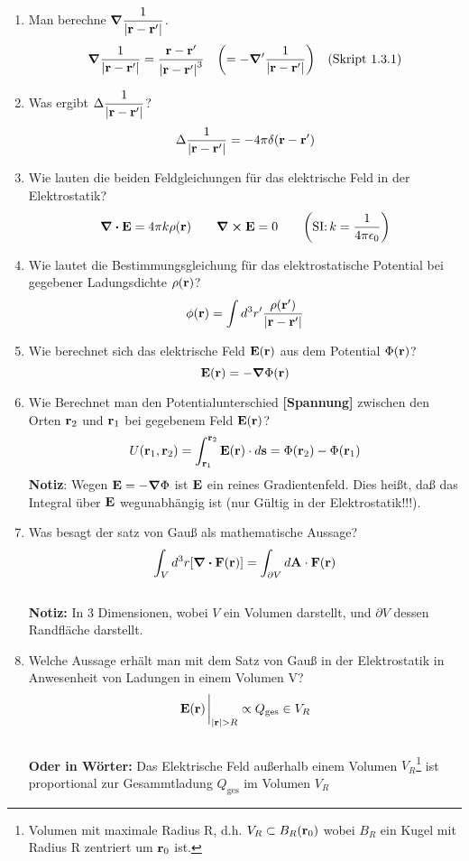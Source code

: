 \documentclass{scrartcl}
\newcommand{\rr}[1]{\frac{#1}{\abs{\vb{r}-\vb{r}'}}}
\newcommand{\ds}{\displaystyle}
\begin{document}
  \begin{enumerate}
    \item Man berechne $\ds \grad\rr{1}$.
          $$\ds \grad\rr{1}=
           \frac{\vb r -\vb r'}{\abs{\vb r - \vb r'}^3}\quad
           \qty(=-\grad'\rr{1})\quad\text{(Skript 1.3.1)}$$ 

    \item Was ergibt $\ds \Delta\rr{1}$?
          $$\ds \Delta \rr{1} = -4\pi \delta(\vb r-\vb r')$$
      
    \item Wie lauten die beiden Feldgleichungen für das 
          elektrische Feld in der Elektrostatik?
          $$\ds \div \vb E=4\pi k\rho(\vb r)\qquad\curl\vb E=0
           \qquad\qty(\text{SI:}\,k=\frac{1}{4\pi\epsilon_0})$$
    
    \item Wie lautet die Bestimmungsgleichung für das elektrostatische 
          Potential bei gegebener Ladungsdichte $\rho(\vb r)$?
          $$\ds \phi(\vb r)=\int d^3r'\rr{\rho(\vb r')}$$

    \item Wie berechnet sich das elektrische Feld $\vb E (\vb r)$ aus dem
          Potential $\Phi(\vb r)$?
          $$\ds \vb E(\vb r) = - \grad \Phi (\vb r)$$

    \item Wie Berechnet man den Potentialunterschied \textbf{[Spannung]}
          zwischen den Orten 
          $\vb r_2$ und $\vb r_1$ bei gegebenem Feld $\vb E(\vb r)$?
          $$\ds U(\vb r_1, \vb r_2)=\int_{\vb r_1}^{\vb r_2}
           \vb E(\vb r)\cdot d\vb s
           =\Phi(\vb r_2)-\Phi(\vb r_1)$$
          \textbf{Notiz}: Wegen $\vb E=-\grad\Phi$ ist $\vb E$ ein reines
          Gradientenfeld. Dies heißt, daß das Integral über $\vb E$
          wegunabhängig ist (nur Gültig in der Elektrostatik!!!).

    \item Was besagt der satz von Gauß als mathematische Aussage?
          $$\ds \int_V d^3r \qty[\div \vb F(\vb r)]=
           \int_{\partial V}d\vb A\cdot \vb F(\vb r)$$\\
          \textbf{Notiz:} In 3 Dimensionen, wobei $V$ ein Volumen darstellt,
          und $\partial V$ dessen Randfläche darstellt.

    \item Welche Aussage erhält man mit dem Satz von Gauß in der 
          Elektrostatik in Anwesenheit von Ladungen in einem Volumen V?
          $$\vb E(\vb r)\eval_{\abs{\vb r} > R}
            \propto Q_{\text{ges}}\in V_R$$\\
          \textbf{Oder in Wörter:} Das Elektrische Feld außerhalb 
          einem Volumen 
          $V_R$\footnote{Volumen mit 
            maximale Radius R, d.h. $V_R\subset B_R(\vb r_0)$ 
            wobei $B_R$ ein Kugel mit Radius R zentriert um $\vb r_0$ ist.}
          ist proportional zur Gesammtladung $Q_{\text{ges}}$ 
          im Volumen $V_R$


\end{enumerate}
\end{document}
